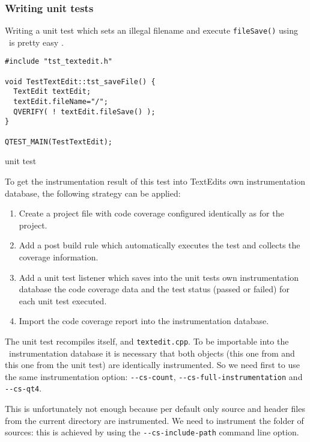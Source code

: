 \subsubsection{Writing unit tests}

Writing a unit test which sets an illegal filename and execute \verb$fileSave()$ using
\QTestLib\ is pretty easy .

\begin{figureenv}
  \scriptsize
\begin{verbatim}
#include "tst_textedit.h"

void TestTextEdit::tst_saveFile() {
  TextEdit textEdit;
  textEdit.fileName="/";
  QVERIFY( ! textEdit.fileSave() );
}

QTEST_MAIN(TestTextEdit);
\end{verbatim}
\caption{{\TextEdit} unit test}
\label{lst:src5}
\end{figureenv}

To get the instrumentation result of this test into TextEdits own
instrumentation database, the following strategy can be applied:
\begin{enumerate}
  \item Create a {\qmake} project file with code coverage configured identically as for the {\TextEdit}
    project. 
  \item Add a post build rule which automatically executes the test and collects
    the coverage information.
  \item Add a unit test listener which saves into the unit tests own instrumentation database
    the code coverage data and the test status (passed or failed) for each unit test executed.
  \item Import the code coverage report into the {\TextEdit} instrumentation database.
\end{enumerate}

The unit test recompiles itself, and \texttt{textedit.cpp}. To be importable into the \TextEdit\
instrumentation database it is necessary that both  objects (this one from
{\TextEdit} and this one from the unit test) are  identically instrumented.
So we need first to use the same instrumentation option: \verb$--cs-count$,
\verb$--cs-full-instrumentation$ and \verb$--cs-qt4$.

This is unfortunately not enough because per default only source and header
files from the current directory are instrumented. We need to instrument the folder of
{\TextEdit} sources: this is achieved by using the \verb$--cs-include-path$ command line option.

